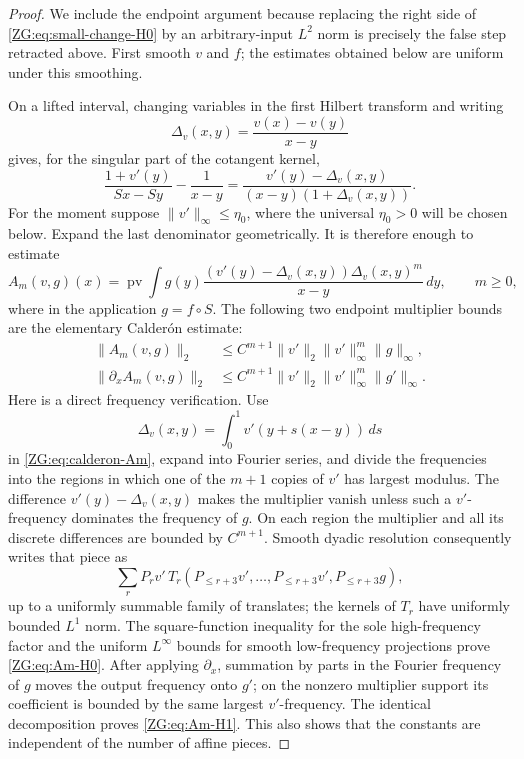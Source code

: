 \begin{proof}
We include the endpoint argument because replacing the right side of
\eqref{ZG:eq:small-change-H0} by an arbitrary-input $L^2$ norm is precisely
the false step retracted above.  First smooth $v$ and $f$; the estimates
obtained below are uniform under this smoothing.

On a lifted interval, changing variables in the first Hilbert transform
and writing
\[
 \Delta_v(x,y)=\frac{v(x)-v(y)}{x-y}
\]
gives, for the singular part of the cotangent kernel,
\begin{equation}\label{ZG:eq:calderon-kernel}
 \frac{1+v'(y)}{Sx-Sy}-\frac1{x-y}
 =\frac{v'(y)-\Delta_v(x,y)}
 {(x-y)(1+\Delta_v(x,y))}.
\end{equation}
For the moment suppose $\|v'\|_\infty\le\eta_0$, where the universal
$\eta_0>0$ will be chosen below.  Expand the last denominator
geometrically.  It is therefore enough to estimate
\begin{equation}\label{ZG:eq:calderon-Am}
 A_m(v,g)(x)=\operatorname {pv}\!\int
 g(y)\frac{(v'(y)-\Delta_v(x,y))
                 \Delta_v(x,y)^m}{x-y}\,dy,
 \qquad m\ge0,
\end{equation}
where in the application $g=f\circ S$.  The following two endpoint
multiplier bounds are the elementary Calder\'on estimate:
\begin{align}
 \|A_m(v,g)\|_2
 &\le C^{m+1}\|v'\|_2\|v'\|_\infty^m\|g\|_\infty,
 \label{ZG:eq:Am-H0}\\
 \|\partial_xA_m(v,g)\|_2
 &\le C^{m+1}\|v'\|_2\|v'\|_\infty^m\|g'\|_\infty.
 \label{ZG:eq:Am-H1}
\end{align}
Here is a direct frequency verification.  Use
\[
 \Delta_v(x,y)=\int_0^1v'(y+s(x-y))\,ds
\]
in \eqref{ZG:eq:calderon-Am}, expand into Fourier series, and divide the
frequencies into the regions in which one of the $m+1$ copies of $v'$
has largest modulus.  The difference
$v'(y)-\Delta_v(x,y)$ makes the multiplier vanish unless such a
$v'$-frequency dominates the frequency of $g$.  On each region the
multiplier and all its discrete differences are bounded by $C^{m+1}$.
Smooth dyadic resolution consequently writes that piece as
\[
 \sum_r P_rv'\,
 T_r(P_{\le r+3}v',\ldots,P_{\le r+3}v',P_{\le r+3}g),
\]
up to a uniformly summable family of translates; the kernels of $T_r$
have uniformly bounded $L^1$ norm.  The square-function inequality for
the sole high-frequency factor and the uniform $L^\infty$ bounds for
smooth low-frequency projections prove \eqref{ZG:eq:Am-H0}.  After applying
$\partial_x$, summation by parts in the Fourier frequency of $g$ moves
the output frequency onto $g'$; on the nonzero multiplier support its
coefficient is bounded by the same largest $v'$-frequency.  The identical
decomposition proves \eqref{ZG:eq:Am-H1}.  This also shows that the constants
are independent of the number of affine pieces.


\end{proof}
